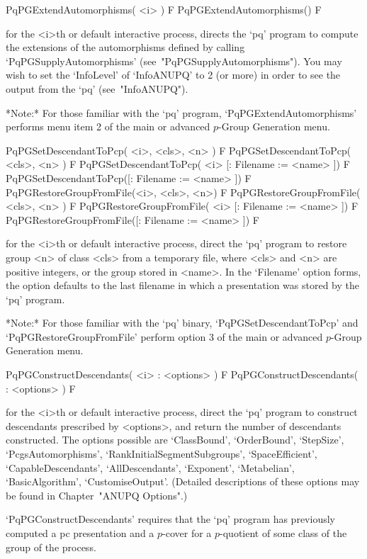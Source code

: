 \>PqPGExtendAutomorphisms( <i> ) F
\>PqPGExtendAutomorphisms() F

for the <i>th or default interactive {\ANUPQ} process, directs  the  `pq'
program to compute the extensions of the automorphisms defined by  calling
`PqPGSupplyAutomorphisms' (see~"PqPGSupplyAutomorphisms"). You  may  wish
to set the `InfoLevel' of `InfoANUPQ' to 2 (or more) in order to see  the
output from the `pq' (see~"InfoANUPQ").

*Note:*    
For  those  familiar  with  the  `pq'  program,  `PqPGExtendAutomorphisms'
performs menu item 2 of the main or advanced $p$-Group Generation menu. 

\>PqPGSetDescendantToPcp( <i>, <cls>, <n> ) F
\>PqPGSetDescendantToPcp( <cls>, <n> ) F
\>PqPGSetDescendantToPcp( <i> [: Filename := <name> ]) F
\>PqPGSetDescendantToPcp([: Filename := <name> ]) F
\>PqPGRestoreGroupFromFile(<i>, <cls>, <n>) F
\>PqPGRestoreGroupFromFile( <cls>, <n> ) F
\>PqPGRestoreGroupFromFile( <i> [: Filename := <name> ]) F
\>PqPGRestoreGroupFromFile([: Filename := <name> ]) F

for the <i>th or default interactive {\ANUPQ} process,  direct  the  `pq'
program to restore group <n> of class <cls> from a temporary file,  where
<cls> and <n> are positive integers, or the group stored  in  <name>.  In
the `Filename' option forms, the option defaults to the last filename  in
which a presentation was stored by the `pq' program.

*Note:* 
For those familiar with the  `pq'  binary,  `PqPGSetDescendantToPcp'  and
`PqPGRestoreGroupFromFile' perform option  3  of  the  main  or  advanced
$p$-Group Generation menu.

\>PqPGConstructDescendants( <i> : <options> ) F
\>PqPGConstructDescendants( : <options> ) F

for the <i>th or default interactive {\ANUPQ} process,  direct  the  `pq'
program to construct descendants prescribed by <options>, and  return  the
number of descendants constructed. The options possible are `ClassBound',
`OrderBound',              `StepSize',               `PcgsAutomorphisms',
`RankInitialSegmentSubgroups',  `SpaceEfficient',   `CapableDescendants',
`AllDescendants',     `Exponent',     `Metabelian',     `BasicAlgorithm',
`CustomiseOutput'. (Detailed descriptions of these options may  be  found
in Chapter~"ANUPQ Options".)

`PqPGConstructDescendants' requires that the `pq' program  has  previously
computed a pc presentation and a $p$-cover for  a  $p$-quotient  of  some
class of the group of the process.

